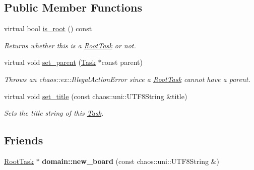 \subsection*{Public Member Functions}
\begin{DoxyCompactItemize}
\item 
\hypertarget{classsigma_1_1core_1_1tasks_1_1_root_task_a121303d6c4380323fe54bc823ef11514}{virtual bool \hyperlink{classsigma_1_1core_1_1tasks_1_1_root_task_a121303d6c4380323fe54bc823ef11514}{is\-\_\-root} () const }\label{classsigma_1_1core_1_1tasks_1_1_root_task_a121303d6c4380323fe54bc823ef11514}

\begin{DoxyCompactList}\small\item\em Returns whether this is a \hyperlink{classsigma_1_1core_1_1tasks_1_1_root_task}{Root\-Task} or not. \end{DoxyCompactList}\item 
\hypertarget{classsigma_1_1core_1_1tasks_1_1_root_task_a4b9f9c86ba7a0e5b681479a444cd60b1}{virtual void \hyperlink{classsigma_1_1core_1_1tasks_1_1_root_task_a4b9f9c86ba7a0e5b681479a444cd60b1}{set\-\_\-parent} (\hyperlink{classsigma_1_1core_1_1tasks_1_1_task}{Task} $\ast$const parent)}\label{classsigma_1_1core_1_1tasks_1_1_root_task_a4b9f9c86ba7a0e5b681479a444cd60b1}

\begin{DoxyCompactList}\small\item\em Throws an chaos\-::ex\-::\-Illegal\-Action\-Error since a \hyperlink{classsigma_1_1core_1_1tasks_1_1_root_task}{Root\-Task} cannot have a parent. \end{DoxyCompactList}\item 
\hypertarget{classsigma_1_1core_1_1tasks_1_1_root_task_ad618706d088cbe4492402c6f2b2628e2}{virtual void \hyperlink{classsigma_1_1core_1_1tasks_1_1_root_task_ad618706d088cbe4492402c6f2b2628e2}{set\-\_\-title} (const chaos\-::uni\-::\-U\-T\-F8\-String \&title)}\label{classsigma_1_1core_1_1tasks_1_1_root_task_ad618706d088cbe4492402c6f2b2628e2}

\begin{DoxyCompactList}\small\item\em Sets the title string of this \hyperlink{classsigma_1_1core_1_1tasks_1_1_task}{Task}. \end{DoxyCompactList}\end{DoxyCompactItemize}
\subsection*{Friends}
\begin{DoxyCompactItemize}
\item 
\hypertarget{classsigma_1_1core_1_1tasks_1_1_root_task_abbeca6ea45fce024d5ee3def03a97132}{\hyperlink{classsigma_1_1core_1_1tasks_1_1_root_task}{Root\-Task} $\ast$ {\bfseries domain\-::new\-\_\-board} (const chaos\-::uni\-::\-U\-T\-F8\-String \&)}\label{classsigma_1_1core_1_1tasks_1_1_root_task_abbeca6ea45fce024d5ee3def03a97132}

\end{DoxyCompactItemize}

